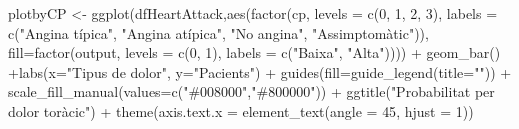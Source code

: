 \documentclass[
]{article}
\newenvironment{Shaded}{\begin{snugshade}}{\end{snugshade}}
\newcommand{\AttributeTok}[1]{\textcolor[rgb]{0.80,0.80,0.80}{#1}}
\newcommand{\DecValTok}[1]{\textcolor[rgb]{0.86,0.86,0.80}{#1}}
\newcommand{\FunctionTok}[1]{\textcolor[rgb]{0.94,0.94,0.56}{#1}}
\newcommand{\NormalTok}[1]{\textcolor[rgb]{0.80,0.80,0.80}{#1}}
\newcommand{\OtherTok}[1]{\textcolor[rgb]{0.94,0.94,0.56}{#1}}
\newcommand{\SpecialCharTok}[1]{\textcolor[rgb]{0.86,0.64,0.64}{#1}}
\newcommand{\StringTok}[1]{\textcolor[rgb]{0.80,0.58,0.58}{#1}}
\begin{document}
\begin{Shaded}
\begin{Highlighting}[]
\NormalTok{plotbyCP }\OtherTok{\textless{}{-}} \FunctionTok{ggplot}\NormalTok{(dfHeartAttack,}\FunctionTok{aes}\NormalTok{(}\FunctionTok{factor}\NormalTok{(cp, }\AttributeTok{levels =} \FunctionTok{c}\NormalTok{(}\DecValTok{0}\NormalTok{, }\DecValTok{1}\NormalTok{, }\DecValTok{2}\NormalTok{, }\DecValTok{3}\NormalTok{), }\AttributeTok{labels =} \FunctionTok{c}\NormalTok{(}\StringTok{"Angina típica"}\NormalTok{, }\StringTok{"Angina atípica"}\NormalTok{, }\StringTok{"No angina"}\NormalTok{, }\StringTok{"Assimptomàtic"}\NormalTok{)), }\AttributeTok{fill=}\FunctionTok{factor}\NormalTok{(output, }\AttributeTok{levels =} \FunctionTok{c}\NormalTok{(}\DecValTok{0}\NormalTok{, }\DecValTok{1}\NormalTok{), }\AttributeTok{labels =} \FunctionTok{c}\NormalTok{(}\StringTok{"Baixa"}\NormalTok{, }\StringTok{"Alta"}\NormalTok{)))) }\SpecialCharTok{+} 
                    \FunctionTok{geom\_bar}\NormalTok{() }\SpecialCharTok{+}\FunctionTok{labs}\NormalTok{(}\AttributeTok{x=}\StringTok{"Tipus de dolor"}\NormalTok{, }\AttributeTok{y=}\StringTok{"Pacients"}\NormalTok{) }\SpecialCharTok{+} 
                    \FunctionTok{guides}\NormalTok{(}\AttributeTok{fill=}\FunctionTok{guide\_legend}\NormalTok{(}\AttributeTok{title=}\StringTok{""}\NormalTok{)) }\SpecialCharTok{+} 
                  \FunctionTok{scale\_fill\_manual}\NormalTok{(}\AttributeTok{values=}\FunctionTok{c}\NormalTok{(}\StringTok{"\#008000"}\NormalTok{,}\StringTok{"\#800000"}\NormalTok{)) }\SpecialCharTok{+} 
                    \FunctionTok{ggtitle}\NormalTok{(}\StringTok{"Probabilitat per dolor toràcic"}\NormalTok{) }\SpecialCharTok{+}
          \FunctionTok{theme}\NormalTok{(}\AttributeTok{axis.text.x =} \FunctionTok{element\_text}\NormalTok{(}\AttributeTok{angle =} \DecValTok{45}\NormalTok{, }\AttributeTok{hjust =} \DecValTok{1}\NormalTok{))}


\end{Highlighting}
\end{Shaded}
\end{document}
